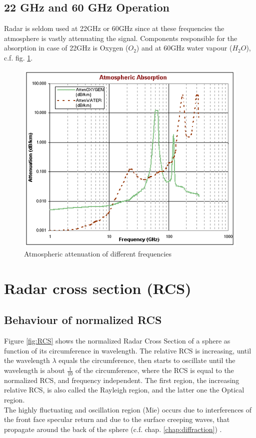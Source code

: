 \subsection{22 GHz and 60 GHz Operation}
Radar is seldom used at 22GHz or 60GHz since at these frequencies the atmosphere is vastly attenuating the signal. Components responsible for the absorption in case of 22GHz is Oxygen ($O_2$) and at 60GHz water vapour ($H_2O$), c.f. fig. \ref{fig:absorb}.
\begin{figure}[h!]
	\centering
	\includegraphics[width=0.7\linewidth]{images/absorbtion}
	\caption{Atmospheric attenuation of different frequencies \protect\footnotemark}	
	\label{fig:absorb}
\end{figure}



\section{Radar cross section (RCS)}

\subsection{Behaviour of normalized RCS}
Figure \ref{fig:RCS} shows the normalized Radar Cross Section of a sphere as function of its circumference in wavelength. The relative RCS is increasing, until the wavelength $\lambda$ equals the circumference, then starts to oscillate until the wavelength is about $\frac{1}{10}$ of the circumference, where the RCS is equal to the normalized RCS, and frequency independent. The first region, the increasing relative RCS, is also called the Rayleigh region, and the latter one the Optical region.\\
The highly fluctuating and oscillation region (Mie) occurs due to interferences of the front face specular return and due to the surface creeping waves, that propagate around the back of the sphere (c.f. chap. \ref{chap:diffraction}) \citep{richards2010principles}.

